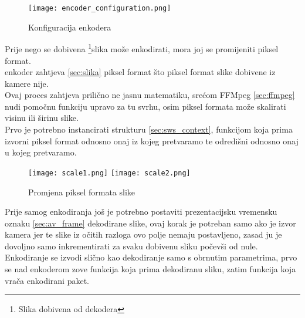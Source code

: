 \begin{figure}[h]
  \texttt{[image: encoder\_configuration.png]}
  \caption{Konfiguracija enkodera}
\end{figure}
\noindent
Prije nego se dobivena \footnote{Slika dobivena od dekodera}{slika} može enkodirati, mora joj se promijeniti piksel format. \\
 enkoder zahtjeva  \ref{sec:slika} piksel format što piksel format slike dobivene iz 
kamere nije. \\
Ovaj proces zahtjeva prilično ne jasnu matematiku, srećom FFMpeg \ref{sec:ffmpeg} nudi pomočnu
funkciju  upravo za tu svrhu, osim piksel formata može skalirati visinu ili širinu slike. \\
Prvo je potrebno instancirati strukturu  \ref{sec:sws_context}, funkcijom 
koja prima izvorni piksel format odnosno onaj iz kojeg pretvaramo te odredišni odnosno onaj u kojeg pretvaramo.

\begin{figure}[h]
  \texttt{[image: scale1.png]}
  \texttt{[image: scale2.png]}
  \caption{Promjena piksel formata slike}
\end{figure}
\noindent
Prije samog enkodiranja još je potrebno postaviti prezentacijsku vremensku oznaku \ref{sec:av_frame} dekodirane slike,
ovaj korak je potreban samo ako je izvor kamera jer te slike iz očitih razloga ovo polje nemaju postavljeno, zasad ju je
dovoljno samo inkrementirati za svaku dobivenu sliku počevši od nule.
\paraBreak
Enkodiranje se izvodi slično kao dekodiranje samo s obrnutim parametrima, prvo se nad enkoderom zove funkcija
 koja prima dekodiranu sliku, zatim funkcija  koja 
vrača enkodirani paket.

